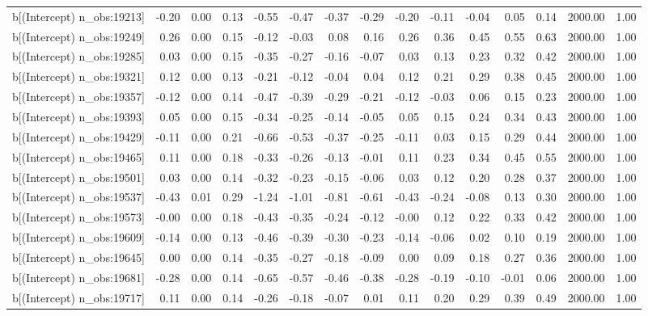 \begin{table}[ht]
\begin{tabular}{rrrrrrrrrrrrrrr}
  b[(Intercept) n\_obs:19213] & -0.20 & 0.00 & 0.13 & -0.55 & -0.47 & -0.37 & -0.29 & -0.20 & -0.11 & -0.04 & 0.05 & 0.14 & 2000.00 & 1.00 \\ 
  b[(Intercept) n\_obs:19249] & 0.26 & 0.00 & 0.15 & -0.12 & -0.03 & 0.08 & 0.16 & 0.26 & 0.36 & 0.45 & 0.55 & 0.63 & 2000.00 & 1.00 \\ 
  b[(Intercept) n\_obs:19285] & 0.03 & 0.00 & 0.15 & -0.35 & -0.27 & -0.16 & -0.07 & 0.03 & 0.13 & 0.23 & 0.32 & 0.42 & 2000.00 & 1.00 \\ 
  b[(Intercept) n\_obs:19321] & 0.12 & 0.00 & 0.13 & -0.21 & -0.12 & -0.04 & 0.04 & 0.12 & 0.21 & 0.29 & 0.38 & 0.45 & 2000.00 & 1.00 \\ 
  b[(Intercept) n\_obs:19357] & -0.12 & 0.00 & 0.14 & -0.47 & -0.39 & -0.29 & -0.21 & -0.12 & -0.03 & 0.06 & 0.15 & 0.23 & 2000.00 & 1.00 \\ 
  b[(Intercept) n\_obs:19393] & 0.05 & 0.00 & 0.15 & -0.34 & -0.25 & -0.14 & -0.05 & 0.05 & 0.15 & 0.24 & 0.34 & 0.43 & 2000.00 & 1.00 \\ 
  b[(Intercept) n\_obs:19429] & -0.11 & 0.00 & 0.21 & -0.66 & -0.53 & -0.37 & -0.25 & -0.11 & 0.03 & 0.15 & 0.29 & 0.44 & 2000.00 & 1.00 \\ 
  b[(Intercept) n\_obs:19465] & 0.11 & 0.00 & 0.18 & -0.33 & -0.26 & -0.13 & -0.01 & 0.11 & 0.23 & 0.34 & 0.45 & 0.55 & 2000.00 & 1.00 \\ 
  b[(Intercept) n\_obs:19501] & 0.03 & 0.00 & 0.14 & -0.32 & -0.23 & -0.15 & -0.06 & 0.03 & 0.12 & 0.20 & 0.28 & 0.37 & 2000.00 & 1.00 \\ 
  b[(Intercept) n\_obs:19537] & -0.43 & 0.01 & 0.29 & -1.24 & -1.01 & -0.81 & -0.61 & -0.43 & -0.24 & -0.08 & 0.13 & 0.30 & 2000.00 & 1.00 \\ 
  b[(Intercept) n\_obs:19573] & -0.00 & 0.00 & 0.18 & -0.43 & -0.35 & -0.24 & -0.12 & -0.00 & 0.12 & 0.22 & 0.33 & 0.42 & 2000.00 & 1.00 \\ 
  b[(Intercept) n\_obs:19609] & -0.14 & 0.00 & 0.13 & -0.46 & -0.39 & -0.30 & -0.23 & -0.14 & -0.06 & 0.02 & 0.10 & 0.19 & 2000.00 & 1.00 \\ 
  b[(Intercept) n\_obs:19645] & 0.00 & 0.00 & 0.14 & -0.35 & -0.27 & -0.18 & -0.09 & 0.00 & 0.09 & 0.18 & 0.27 & 0.36 & 2000.00 & 1.00 \\ 
  b[(Intercept) n\_obs:19681] & -0.28 & 0.00 & 0.14 & -0.65 & -0.57 & -0.46 & -0.38 & -0.28 & -0.19 & -0.10 & -0.01 & 0.06 & 2000.00 & 1.00 \\ 
  b[(Intercept) n\_obs:19717] & 0.11 & 0.00 & 0.14 & -0.26 & -0.18 & -0.07 & 0.01 & 0.11 & 0.20 & 0.29 & 0.39 & 0.49 & 2000.00 & 1.00 \\ 

\end{tabular}
\end{table}
